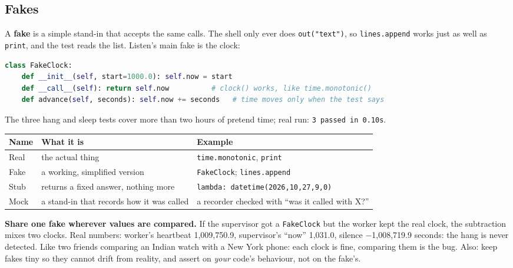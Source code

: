 \documentclass[11pt,a4paper]{article}
\begin{document}
\subsection{Fakes}
A \textbf{fake} is a simple stand-in that accepts the same calls. The shell only ever does
\texttt{out("text")}, so \texttt{lines.append} works just as well as \texttt{print}, and the test
reads the list. Listen's main fake is the clock:
\begin{lstlisting}[language=Python]
class FakeClock:
    def __init__(self, start=1000.0): self.now = start
    def __call__(self): return self.now          # clock() works, like time.monotonic()
    def advance(self, seconds): self.now += seconds   # time moves only when the test says
\end{lstlisting}
\noindent The three hang and sleep tests cover more than two hours of pretend time; real run:
\texttt{3 passed in 0.10s}.

\begin{center}
\renewcommand{\arraystretch}{1.15}
\begin{tabularx}{\textwidth}{l X X}
\toprule
\textbf{Name} & \textbf{What it is} & \textbf{Example} \\
\midrule
Real & the actual thing & \texttt{time.monotonic}, \texttt{print} \\
Fake & a working, simplified version & \texttt{FakeClock}; \texttt{lines.append} \\
Stub & returns a fixed answer, nothing more & \texttt{lambda: datetime(2026,10,27,9,0)} \\
Mock & a stand-in that records how it was called & a recorder checked with ``was it called with X?'' \\
\bottomrule
\end{tabularx}
\end{center}

\begin{caution}
\textbf{Share one fake wherever values are compared.} If the supervisor got a \texttt{FakeClock}
but the worker kept the real clock, the subtraction mixes two clocks. Real numbers: worker's
heartbeat 1{,}009{,}750.9, supervisor's ``now'' 1{,}031.0, silence $-$1{,}008{,}719.9 seconds:
the hang is never detected. Like two friends comparing an Indian watch with a New York phone:
each clock is fine, comparing them is the bug. Also: keep fakes tiny so they cannot drift from
reality, and assert on \emph{your} code's behaviour, not on the fake's.
\end{caution}
\end{document}
